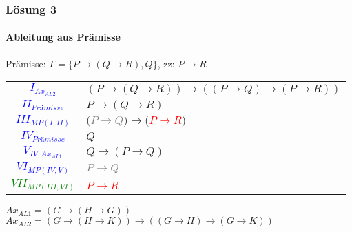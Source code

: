 \begin{frame}
	\frametitle{Lösung 3}
	\framesubtitle{Ableitung aus Prämisse}
	Prämisse: $\Gamma =\{P\rightarrow(Q\rightarrow R), Q\}$, zz: $P\rightarrow R$\\
	\begin{tabular}{cl}
		\textcolor{blue}{$I_{Ax_{AL2}}$}       & $(P\rightarrow(Q\rightarrow R))\rightarrow((P\rightarrow Q)\rightarrow(P\rightarrow R))$ \\
		\textcolor{blue}{$II_{Prämisse}$}      & $P\rightarrow(Q\rightarrow R)$                                                           \\
		\textcolor{blue}{$III_{MP(I, II)}$}    & $($\textcolor{gray}{$P\rightarrow Q$}$)\rightarrow($\textcolor{red}{$P\rightarrow R$}$)$ \\
		\textcolor{blue}{$IV_{Prämisse}$}      & $Q$                                                                                      \\
		\textcolor{blue}{$V_{IV, Ax_{AL1}}$}   & $Q\rightarrow(P\rightarrow Q)$                                                           \\
		\textcolor{blue}{$VI_{MP(IV, V)}$}     & \textcolor{gray}{$P\rightarrow Q$}                                                       \\
		\textcolor{green}{$VII_{MP(III, VI)}$} & \textcolor{red}{$P\rightarrow R$}                                                        \\
	\end{tabular}
	$Ax_{AL1} = (G\rightarrow(H\rightarrow G))$\\
	$Ax_{AL2} = (G\rightarrow(H\rightarrow K))\rightarrow((G\rightarrow H)\rightarrow(G\rightarrow K))$\\
\end{frame}

